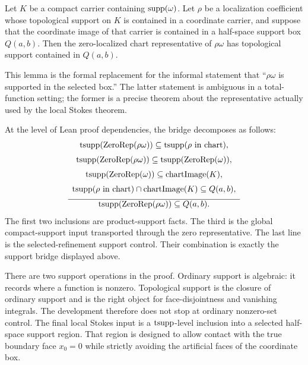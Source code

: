 \begin{lemma}
\label{lem:zero-support}
Let \(K\) be a compact carrier containing \(\operatorname{supp}(\omega)\).  Let \(\rho\) be a
localization coefficient whose topological support on \(K\) is contained in a
coordinate carrier, and suppose that the coordinate image of that carrier is
contained in a half-space support box \(Q(a,b)\).  Then the zero-localized chart
representative of \(\rho\omega\) has topological support contained in
\(Q(a,b)\).
\end{lemma}

This lemma is the formal replacement for the informal statement that
``\(\rho\omega\) is supported in the selected box.''  The latter statement is
ambiguous in a total-function setting; the former is a precise theorem about
the representative actually used by the local Stokes theorem.

At the level of Lean proof dependencies, the bridge decomposes as follows:
\[
\begin{array}{c}
\operatorname{tsupp}(\operatorname{ZeroRep}(\rho\omega))
  \subseteq
  \operatorname{tsupp}(\rho\text{ in chart}),\\[2mm]
\operatorname{tsupp}(\operatorname{ZeroRep}(\rho\omega))
  \subseteq
  \operatorname{tsupp}(\operatorname{ZeroRep}(\omega)),\\[2mm]
\operatorname{tsupp}(\operatorname{ZeroRep}(\omega))
  \subseteq \operatorname{chartImage}(K),\\[2mm]
\operatorname{tsupp}(\rho\text{ in chart})\cap \operatorname{chartImage}(K)
  \subseteq Q(a,b),\\[2mm]
\hline
\operatorname{tsupp}(\operatorname{ZeroRep}(\rho\omega))\subseteq Q(a,b).
\end{array}
\]
The first two inclusions are product-support facts.  The third is the global
compact-support input transported through the zero representative.  The last
line is the selected-refinement support control.  Their combination is exactly
the support bridge displayed above.

There are two support operations in the proof.  Ordinary support is algebraic:
it records where a function is nonzero.  Topological support is the closure of
ordinary support and is the right object for face-disjointness and vanishing
integrals.  The development therefore does not stop at ordinary nonzero-set
control.  The final local Stokes input is a \(\operatorname{tsupp}\)-level inclusion into a
selected half-space support region.  That region is designed to allow contact
with the true boundary face \(x_0=0\) while strictly avoiding the artificial
faces of the coordinate box.

